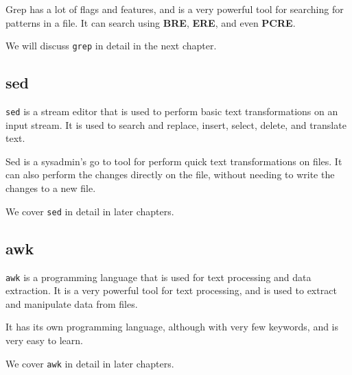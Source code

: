 Grep has a lot of flags and features, and is a very powerful tool for searching for patterns in a file.
It can search using \textbf{BRE}, \textbf{ERE}, and even \textbf{PCRE}.

We will discuss \lstinline|grep| in detail in the next chapter.

\subsection{sed}

\lstinline|sed| is a stream editor that is used to perform basic text transformations on an input stream. It is used to search and replace, insert, select, delete, and translate text.

Sed is a sysadmin's go to tool for perform quick text transformations on files.
It can also perform the changes directly on the file, without needing to write the changes to a new file.

We cover \lstinline|sed| in detail in later chapters.

\subsection{awk}

\lstinline|awk| is a programming language that is used for text processing and data extraction. It is a very powerful tool for text processing, and is used to extract and manipulate data from files.

It has its own programming language, although with very few keywords, and is very easy to learn.

We cover \lstinline|awk| in detail in later chapters.
